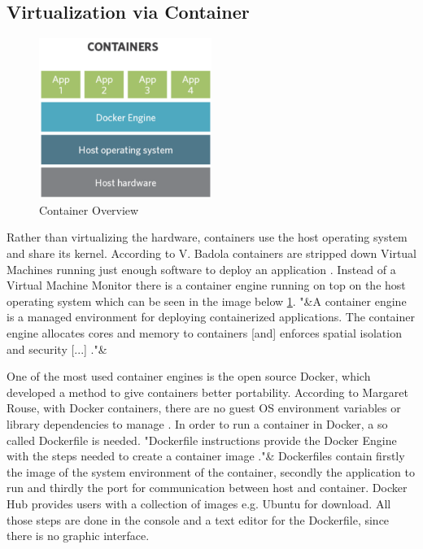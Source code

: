 \documentclass[utf8,biblatex, ngerman, english]{lni}
\begin{document}
\subsection{Virtualization via Container}

\begin{figure}
  \centering
  \includegraphics[width=0.5\textwidth]{Container.pdf}
  \caption{Container Overview}
  \label{img:container}
\end{figure}

Rather than virtualizing the hardware, containers use the host operating system and share its kernel. According to V. Badola containers are stripped down Virtual Machines running just enough software to deploy an application \cite{Cv15}. Instead of a Virtual Machine Monitor there is a container engine running on top on the host operating system which can be seen in the image below \ref{img:container}. "&A container engine is a managed environment for deploying containerized applications. The container engine allocates cores and memory to containers [and] enforces spatial isolation and security [...] \cite{VC17}."&

One of the most used container engines is the open source Docker, which developed a method to give containers better portability. According to Margaret Rouse, with Docker containers, there are no guest OS environment variables or library dependencies to manage \cite{cz}. In order to run a container in Docker, a so called Dockerfile is needed. "Dockerfile instructions provide the Docker Engine with the steps needed to create a container image \cite{DW16}."& Dockerfiles contain firstly the image of the system environment of the container, secondly the application to run and thirdly the port for communication between host and container. Docker Hub provides users with a collection of images e.g. Ubuntu for download. All those steps are done in the console and a text editor for the Dockerfile, since there is no graphic interface.
\end{document}
